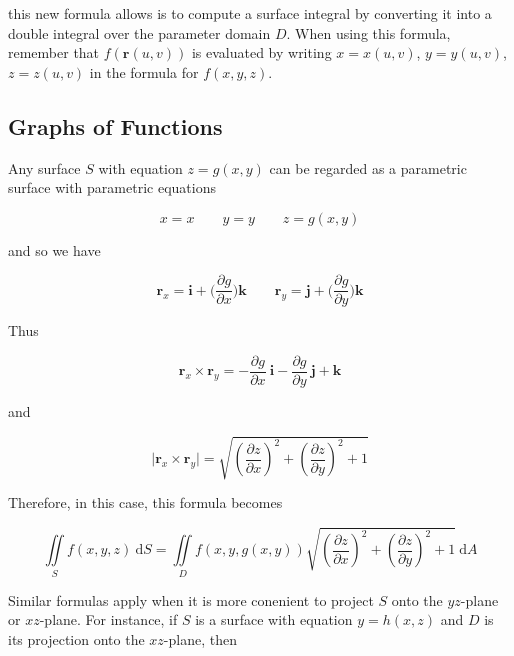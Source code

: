 \documentclass{article}
\begin{document}
this new formula allows is to compute a surface integral by converting it into a double integral over the parameter domain $D$. When using this formula, remember that $f(\mathbf{r}(u,v))$ is evaluated by writing $x = x(u,v)$, $y = y(u,v)$, $z = z(u,v)$ in the formula for $f(x,y,z)$.



\subsection{Graphs of Functions}

Any surface $S$ with equation $z = g(x,y)$ can be regarded as a parametric surface with parametric equations

\begin{equation*}
    x = x \qquad y = y \qquad z = g(x,y)
\end{equation*}

and so we have 

\begin{equation*}
    \mathbf{r}_x = \mathbf{i} + \bigg( \frac{\partial g}{\partial x} \bigg) \mathbf{k} \qquad \mathbf{r}_y = \mathbf{j} + \bigg(  \frac{\partial g}{\partial y}\bigg) \mathbf{k}
\end{equation*}

Thus

\begin{equation*}
    \mathbf{r}_x  \times \mathbf{r}_y = - \frac{\partial g }{\partial x} \ \mathbf{i} - \frac{\partial g}{\partial y} \ \mathbf{j} + \mathbf{k} 
\end{equation*}

and 

\begin{equation*}
    \bigg\rvert \mathbf{r}_x \times \mathbf{r}_y \bigg\rvert = \sqrt{(\frac{\partial z}{\partial x})^2 + (\frac{\partial z}{\partial y})^2 + 1}
\end{equation*}

Therefore, in this case, this formula becomes 

\begin{equation*}
    \iint\limits_{S} f(x,y,z) \ \mathrm{d}S = \iint\limits_{D} f(x,y,g(x,y))\sqrt{(\frac{\partial z}{\partial x})^2 + (\frac{\partial z}{\partial y})^2 + 1} \ \mathrm{d} A
\end{equation*}

Similar formulas apply when it is more conenient to project $S$ onto the $yz$-plane or $xz$-plane. For instance, if $S$ is a surface with equation $y = h(x,z)$ and $D$ is its projection onto the $xz$-plane, then
\end{document}
